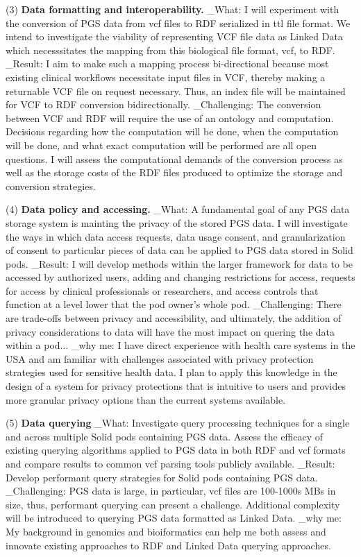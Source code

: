 \documentclass[a4paper,11pt]{article}
\begin{document}
(3) \textbf{Data formatting and interoperability.} 
_What: I will experiment with the conversion of PGS data from vcf files to RDF serialized in ttl file format. 
We intend to investigate the viability of representing VCF file data as Linked Data which necesssitates the mapping from this biological file format, vcf, to RDF. 
_Result: I aim to make such a mapping process bi-directional because most existing clinical workflows necessitate input files in VCF, thereby making a returnable VCF file on request necessary. 
Thus, an index file will be maintained for VCF to RDF conversion bidirectionally.
_Challenging: The conversion between VCF and RDF will require the use of an ontology and computation. 
Decisions regarding how the computation will be done, when the computation will be done, and what exact computation will be performed are all open questions.
I will assess the computational demands of the conversion process as well as the storage costs of the RDF files produced to optimize the storage and conversion strategies.


(4) \textbf{Data policy and accessing.} 
_What: A fundamental goal of any PGS data storage system is mainting the privacy of the stored PGS data. 
I will investigate the ways in which data access requests, data usage consent, and granularization of consent to particular pieces of data can be applied to PGS data stored in Solid pods.
_Result: I will develop methods within the larger framework for data to be accessed by authorized users, adding and changing restrictions for access, requests for access by clinical professionals or researchers, and access controls that function at a level lower that the pod owner's whole pod.
_Challenging: There are trade-offs between privacy and accessibility, and ultimately, the addition of privacy considerations to data will have the most impact on quering the data within a pod...
_why me: I have direct experience with health care systems in the USA and am familiar with challenges associated with privacy protection strategies used for sensitive health data. 
I plan to apply this knowledge in the design of a system for privacy protections that is intuitive to users and provides more granular privacy options than the current systems available. 

(5) \textbf{Data querying}
_What: Investigate query processing techniques for a single and across multiple Solid pods containing PGS data. 
Assess the efficacy of existing querying algorithms applied to PGS data in both RDF and vcf formats and compare results to common vcf parsing tools publicly available.
_Result: Develop performant query strategies for Solid pods containing PGS data.
_Challenging: PGS data is large, in particular, vcf files are 100-1000s MBs in size, thus, performant querying can present a challenge. Additional complexity will be introduced to querying PGS data formatted as Linked Data.
_why me: My background in genomics and bioiformatics can help me both assess and innovate existing approaches to RDF and Linked Data querying approaches.
\end{document}
